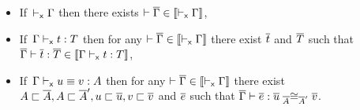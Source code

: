 \begin{theorem}[Translation]
  \leavevmode
  \begin{itemize}
    \item If\,\,\,$\xisctx{\Ga}$ then there exists
    $\isctx{\Gb} \in \transl{\xisctx{\Ga}}$,

    \item If\,\,\,$\xisterm{\Ga}{t}{T}$ then for any
    $\isctx{\Gb} \in \transl{\xisctx{\Ga}}$ there exist $\tb$ and $\Tb$ such
    that $\isterm{\Gb}{\tb}{\Tb} \in \transl{\xisterm{\Ga}{t}{T}}$,

    \item If\,\,\,$\xeqterm{\Ga}{u}{v}{A}$ then for any
    $\isctx{\Gb} \in \transl{\xisctx{\Ga}}$ there exist
    $A \ir \Ab, A \ir \Ab', u \ir \ub, v \ir \vb$ and $\eb$ such that
    $\isterm{\Gb}{\eb}{\Heq{\Ab}{\ub}{\Ab'}{\vb}}$.
  \end{itemize}
\end{theorem}

